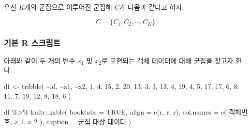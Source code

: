 \documentclass[
]{book}
\newenvironment{Shaded}{\begin{snugshade}}{\end{snugshade}}
\newcommand{\AttributeTok}[1]{\textcolor[rgb]{0.77,0.63,0.00}{#1}}
\newcommand{\ConstantTok}[1]{\textcolor[rgb]{0.00,0.00,0.00}{#1}}
\newcommand{\DecValTok}[1]{\textcolor[rgb]{0.00,0.00,0.81}{#1}}
\newcommand{\FunctionTok}[1]{\textcolor[rgb]{0.00,0.00,0.00}{#1}}
\newcommand{\NormalTok}[1]{#1}
\newcommand{\OtherTok}[1]{\textcolor[rgb]{0.56,0.35,0.01}{#1}}
\newcommand{\SpecialCharTok}[1]{\textcolor[rgb]{0.00,0.00,0.00}{#1}}
\newcommand{\StringTok}[1]{\textcolor[rgb]{0.31,0.60,0.02}{#1}}
\begin{document}
우선 \(K\)개의 군집으로 이루어진 군집해 \(C\)가 다음과 같다고 하자.

\begin{equation*}
C = \{ C_1, C_2, \cdots, C_K \}
\end{equation*}

\hypertarget{cluster-evaluation-internal-index-basic-script}{%
\subsubsection{기본 R 스크립트}\label{cluster-evaluation-internal-index-basic-script}}

아래와 같이 두 개의 변수 \(x_1\) 및 \(x_2\)로 표현되는 객체 데이터에 대해 군집을 찾고자 한다.

\begin{Shaded}
\begin{Highlighting}[]
\NormalTok{df }\OtherTok{\textless{}{-}} \FunctionTok{tribble}\NormalTok{(}
  \SpecialCharTok{\textasciitilde{}}\NormalTok{id, }\SpecialCharTok{\textasciitilde{}}\NormalTok{x1, }\SpecialCharTok{\textasciitilde{}}\NormalTok{x2,}
  \DecValTok{1}\NormalTok{, }\DecValTok{4}\NormalTok{, }\DecValTok{15}\NormalTok{,}
  \DecValTok{2}\NormalTok{, }\DecValTok{20}\NormalTok{, }\DecValTok{13}\NormalTok{,}
  \DecValTok{3}\NormalTok{, }\DecValTok{3}\NormalTok{, }\DecValTok{13}\NormalTok{,}
  \DecValTok{4}\NormalTok{, }\DecValTok{19}\NormalTok{, }\DecValTok{4}\NormalTok{,}
  \DecValTok{5}\NormalTok{, }\DecValTok{17}\NormalTok{, }\DecValTok{17}\NormalTok{,}
  \DecValTok{6}\NormalTok{, }\DecValTok{8}\NormalTok{, }\DecValTok{11}\NormalTok{,}
  \DecValTok{7}\NormalTok{, }\DecValTok{19}\NormalTok{, }\DecValTok{12}\NormalTok{,}
  \DecValTok{8}\NormalTok{, }\DecValTok{18}\NormalTok{, }\DecValTok{6}
\NormalTok{)}

\NormalTok{df }\SpecialCharTok{\%\textgreater{}\%}
\NormalTok{  knitr}\SpecialCharTok{::}\FunctionTok{kable}\NormalTok{(}
    \AttributeTok{booktabs =} \ConstantTok{TRUE}\NormalTok{,}
    \AttributeTok{align =} \FunctionTok{c}\NormalTok{(}\StringTok{\textquotesingle{}r\textquotesingle{}}\NormalTok{, }\StringTok{\textquotesingle{}r\textquotesingle{}}\NormalTok{, }\StringTok{\textquotesingle{}r\textquotesingle{}}\NormalTok{),}
    \AttributeTok{col.names =} \FunctionTok{c}\NormalTok{(}
      \StringTok{\textquotesingle{}객체번호\textquotesingle{}}\NormalTok{, }
      \StringTok{\textquotesingle{}$x\_1$\textquotesingle{}}\NormalTok{, }\StringTok{\textquotesingle{}$x\_2$\textquotesingle{}}
\NormalTok{      ),}
    \AttributeTok{caption =} \StringTok{\textquotesingle{}군집 대상 데이터\textquotesingle{}}
\NormalTok{  )}
\end{Highlighting}
\end{Shaded}
\end{document}
